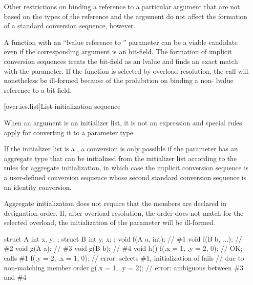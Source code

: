 \pnum
Other restrictions on binding a reference to a particular argument
that are not based on the types of the reference and the argument
do not affect the formation of a standard conversion
sequence, however.
\begin{example}
A function with an ``lvalue reference to '' parameter can
be a viable candidate even if the corresponding argument is an
bit-field.
The formation of implicit conversion sequences
treats the
bit-field as an
lvalue and finds an exact
match with the parameter.
If the function is selected by overload
resolution, the call will nonetheless be ill-formed because of
the prohibition on binding a non- lvalue reference to a bit-field.
\end{example}

[over.ics.list]{List-initialization sequence}

\pnum
When an argument is an initializer list, it is not an
expression and special rules apply for converting it to a parameter type.

\pnum
If the initializer list is a ,
a conversion is only possible if
the parameter has an aggregate type
that can be initialized from the initializer list
according to the rules for aggregate initialization,
in which case the implicit conversion sequence is
a user-defined conversion sequence
whose second standard conversion sequence
is an identity conversion.
\begin{note}
Aggregate initialization does not require that
the members are declared in designation order.
If, after overload resolution, the order does not match
for the selected overload,
the initialization of the parameter will be ill-formed.
\begin{example}
\begin{codeblock}
struct A { int x, y; };
struct B { int y, x; };
void f(A a, int);               // \#1
void f(B b, ...);               // \#2
void g(A a);                    // \#3
void g(B b);                    // \#4
void h() {
  f({.x = 1, .y = 2}, 0);       // OK; calls \#1
  f({.y = 2, .x = 1}, 0);       // error: selects \#1, initialization of  fails
                                // due to non-matching member order
  g({.x = 1, .y = 2});          // error: ambiguous between \#3 and \#4
}
\end{codeblock}
\end{example}
\end{note}

